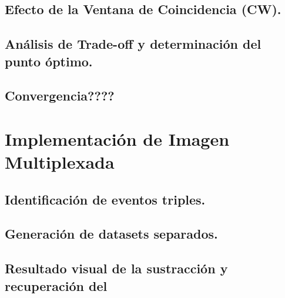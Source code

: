 \subsection{Efecto de la Ventana de Coincidencia (CW).}
\subsection{Análisis de Trade-off y determinación del punto óptimo.}
\subsection{Convergencia????}

\section{Implementación de Imagen Multiplexada}
\label{sec:resultados_discusion:multiplexing}

\subsection{Identificación de eventos triples.}
\subsection{Generación de datasets separados.}
\subsection{Resultado visual de la sustracción y recuperación del \fdiezocho}